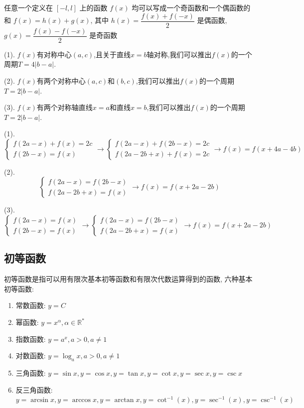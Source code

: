 \begin{corollary}[奇偶性推论]
	任意一个定义在 $[-l,l]$ 上的函数 $f(x)$ 均可以写成一个奇函数和一个偶函数的和 $f(x)=h(x)+g(x)$, 其中 $h(x)=\dfrac{f(x)+f(-x)}{2}$ 是偶函数, $g(x)=\dfrac{f(x)-f(-x)}{2}$ 是奇函数
\end{corollary}

\begin{corollary}
	
	(1). $f(x)$有对称中心$(a,c)$,且关于直线$x=b$轴对称,我们可以推出$f(x)$的一个周期$T=4|b-a|$.
	
	(2). $f(x)$有两个对称中心$(a,c)$和$(b,c)$,我们可以推出$f(x)$的一个周期$T=2|b-a|$.
	
	(3). $f(x)$有两个对称轴直线$x=a$和直线$x=b$,我们可以推出$f(x)$的一个周期$T=2|b-a|$.

\end{corollary}
\begin{anymark}[证明]
	(1).
	$$\begin{cases} f(2a-x)+f(x)=2c  \\ f(2b-x) = f(x)\end{cases}\to \begin{cases} f(2a-x) + f(2b-x) =2c\\ f(2a-2b+x) +f(x) =2c  \end{cases}\to f(x) = f(x+4a-4b)$$

	(2).
	$$\begin{cases} f(2a-x) = f(2b-x)  \\ f(2a-2b+x) = f(x) \end{cases}\to f(x) = f(x+2a-2b)$$

	(3).
	$$\begin{cases} f(2a-x) = f(x)  \\ f(2b-x) = f(x)\end{cases}\to \begin{cases} f(2a-x) = f(2b-x) \\ f(2a-2b+x) = f(x)   \end{cases}\to f(x) = f(x+2a-2b)$$
\end{anymark}

\subsection{初等函数}
\begin{definition}[初等函数]
	初等函数是指可以用有限次基本初等函数和有限次代数运算得到的函数, 六种基本初等函数:
	\begin{enumerate}
		\item 常数函数: $y=C$
		\item 幂函数: $y=x^{\alpha},\alpha\in \mathbb{R}^{*}$
		\item 指数函数: $y=a^{x},a>0,a\neq 1$
		\item 对数函数: $y=\log_{a}x,a>0,a\neq 1$
		\item 三角函数: $y=\sin x, y=\cos x, y=\tan x, y=\cot x, y=\sec x, y=\csc x$
		\item 反三角函数: $y=\arcsin x, y=\arccos x, y=\arctan x, y=\cot^{-1}(x), y=\sec^{-1}(x), y=\csc^{-1}(x)$
	\end{enumerate}
\end{definition}

